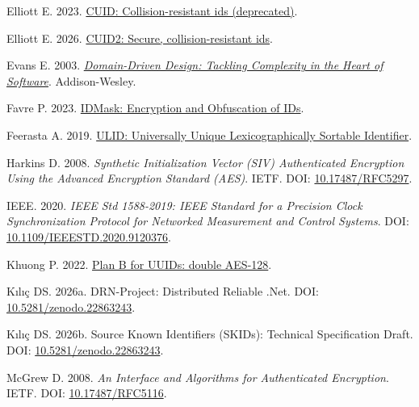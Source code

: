 \documentclass[fleqn,10pt,lineno]{wlpeerj}
\newlength{\cslhangindent}
\newenvironment{CSLReferences}[2]
 {\begin{list}{}{%
  \setlength{\itemindent}{0pt}
  \setlength{\leftmargin}{0pt}
  \setlength{\parsep}{0pt}
  \ifodd #1
   \setlength{\leftmargin}{\cslhangindent}
   \setlength{\itemindent}{-1\cslhangindent}
  \fi
  \setlength{\itemsep}{#2\baselineskip}}}
 {\end{list}}
\begin{document}
\begin{CSLReferences}{1}{0}
Elliott E. 2023.
\href{https://github.com/paralleldrive/cuid/blob/29b8fbfbaadead797ac3b38201c50c55e491a8ce/README.md}{{CUID:
Collision-resistant ids (deprecated)}}.

Elliott E. 2026.
\href{https://github.com/paralleldrive/cuid2/blob/d296cc84463064e511c2d698ce221730d40fdd09/README.md}{{CUID2:
Secure, collision-resistant ids}}.

Evans E. 2003.
\emph{\href{https://www.oreilly.com/library/view/domain-driven-design-tackling/0321125215/}{{Domain-Driven
Design: Tackling Complexity in the Heart of Software}}}. Addison-Wesley.

Favre P. 2023.
\href{https://github.com/patrickfav/id-mask/blob/v0.6.0/README.md}{{IDMask:
Encryption and Obfuscation of IDs}}.

Feerasta A. 2019.
\href{https://github.com/ulid/spec/blob/d0c7170df4517939e70129b4d6462cc162f2d5bf/README.md}{{ULID:
Universally Unique Lexicographically Sortable Identifier}}.

Harkins D. 2008. \emph{{Synthetic Initialization Vector (SIV)
Authenticated Encryption Using the Advanced Encryption Standard (AES)}}.
IETF. DOI: \href{https://doi.org/10.17487/RFC5297}{10.17487/RFC5297}.

IEEE. 2020. \emph{{IEEE Std 1588-2019: IEEE Standard for a Precision
Clock Synchronization Protocol for Networked Measurement and Control
Systems}}. DOI:
\href{https://doi.org/10.1109/IEEESTD.2020.9120376}{10.1109/IEEESTD.2020.9120376}.

Khuong P. 2022.
\href{https://pvk.ca/Blog/2022/07/11/plan-b-for-uuids-double-aes-128/}{{Plan
B for UUIDs: double AES-128}}.

Kılıç DS. 2026a. {DRN-Project: Distributed Reliable .Net}. DOI:
\href{https://doi.org/10.5281/zenodo.22863243}{10.5281/zenodo.22863243}.

Kılıç DS. 2026b. {Source Known Identifiers (SKIDs): Technical
Specification Draft}. DOI:
\href{https://doi.org/10.5281/zenodo.22863243}{10.5281/zenodo.22863243}.

McGrew D. 2008. \emph{{An Interface and Algorithms for Authenticated
Encryption}}. IETF. DOI:
\href{https://doi.org/10.17487/RFC5116}{10.17487/RFC5116}.


\end{CSLReferences}
\end{document}
